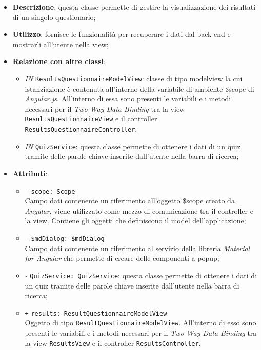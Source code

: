 \begin{itemize}
	\item \textbf{Descrizione}: questa classe permette di gestire la visualizzazione dei risultati di un singolo questionario;
	\item \textbf{Utilizzo}: fornisce le funzionalità per recuperare i dati dal back-end e mostrarli all'utente nella view;
	\item \textbf{Relazione con altre classi}:
	\begin{itemize}
		\item \textit{IN} \texttt{ResultsQuestionnaireModelView}: classe di tipo modelview la cui istanziazione è contenuta all'interno della variabile di ambiente \$scope di \textit{Angular.js}. All'interno di essa sono presenti le variabili e i metodi necessari per il \textit{Two-Way Data-Binding} tra la view \texttt{ResultsQuestionnaireView} e il controller \texttt{ResultsQuestionnaireController}; 
		\item \textit{IN} \texttt{QuizService}: questa classe permette di ottenere i dati di un quiz tramite delle parole chiave inserite dall'utente nella barra di ricerca;
	\end{itemize}
	\item \textbf{Attributi}:
	\begin{itemize}
		\item \texttt{-} \texttt{scope: Scope} \\
		Campo dati contenente un riferimento all’oggetto \$scope creato da \textit{Angular}, viene utilizzato come mezzo di comunicazione tra il controller e la view. Contiene gli oggetti che definiscono il model dell’applicazione;
		\item \texttt{-} \texttt{\$mdDialog: \$mdDialog} \\
		Campo dati contenente un riferimento al servizio della libreria \textit{Material for Angular} che permette di creare delle componenti a popup;
		\item \textit{-} \texttt{QuizService: QuizService}: questa classe permette di ottenere i dati di un quiz tramite delle parole chiave inserite dall'utente nella barra di ricerca;
		\item \texttt{+} \texttt{results: ResultQuestionnaireModelView} \\
		Oggetto di tipo \texttt{ResultQuestionnaireModelView}. All'interno di esso sono presenti le variabili e i metodi necessari per il \textit{Two-Way Data-Binding} tra la view \texttt{ResultsView} e il controller \texttt{ResultsController}.

\end{itemize}
\end{itemize}
